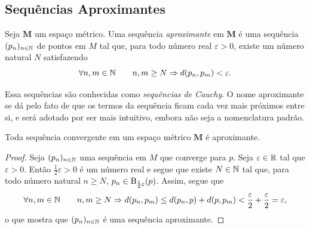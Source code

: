 \subsection{Sequências Aproximantes}

\begin{defi}
Seja $\bm M$ um espaço métrico. Uma sequência \emph{aproximante} em $\bm M$ é uma sequência $(p_n)_{n \in \mathbb{N}}$ de pontos em $M$ tal que, para todo número real $\varepsilon > 0$, existe um número natural $N$ satisfazendo
	\begin{equation*}
	\forall n,m \in \mathbb{N} \qquad n,m \geq N \Rightarrow d(p_n,p_m) < \varepsilon.
	\end{equation*}
\end{defi}

Essa sequências são conhecidas como \emph{sequências de Cauchy}. O nome aproximante se dá pelo fato de que os termos da sequência ficam cada vez mais próximos entre si, e será adotado por ser mais intuitivo, embora não seja a nomenclatura padrão.

\begin{prop}
Toda sequência convergente em um espaço métrico $\bm M$ é aproximante.
\end{prop}
\begin{proof}
Seja $(p_n)_{n \in \mathbb{N}}$ uma sequência em $M$ que converge para $p$. Seja $\varepsilon \in \mathbb{R}$ tal que $\varepsilon > 0$. Então $\frac{1}{2}\varepsilon > 0$ é um número real e segue que existe $N \in \mathbb{N}$ tal que, para todo número natural $n \geq N$, $p_n \in \mathrm{B}_{\frac{1}{2}\varepsilon}(p)$. Assim, segue que	
	\begin{equation*}
	\forall n,m \in \mathbb{N} \qquad n,m \geq N \Rightarrow d(p_n,p_m) \leq d(p_n,p) + d(p,p_m) < \frac{\varepsilon}{2} + \frac{\varepsilon}{2} = \varepsilon,
	\end{equation*}
o que mostra que $(p_n)_{n \in \mathbb{N}}$ é uma sequência aproximante.
\end{proof}

